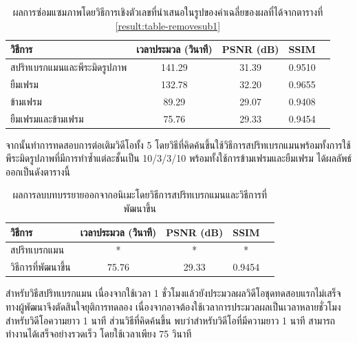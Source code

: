 	\begin{table}[H]
		\centering
		\begin{tabular}[ht]{|l|c|c|c|c|}
			\hline
			วิธีการ  & เวลาประมวล  (วินาที) & PSNR (dB) & SSIM \\
			\hline
			สปริทเบรกแมนและพีระมิดรูปภาพ & 141.29 & 31.39  &  0.9510\\
			ยืมเฟรม & 132.78 & 32.20 & 0.9655\\
			ข้ามเฟรม & 89.29 & 29.07 & 0.9408 \\
			ยืมเฟรมและข้ามเฟรม & 75.76 & 29.33 & 0.9454 \\
			\hline
		\end{tabular}
		\caption{ผลการซ่อมแซมภาพโดยวิธีการเชิงตัวเลขที่นำเสนอในรูปของค่าเฉลี่ยของผลที่ได้จากตารางที่ \ref{result:table-removesub1}}
	\end{table}	
	
	\hspace{1cm}  จากนั้นทำการทดสอบการต่อเติมวิดีโอทั้ง 5 โดยวิธีที่คิดค้นขึ้นใช้วิธีการสปริทเบรกแมนพร้อมทั้งการใช้พีระมิดรูปภาพที่มีการทำซ้ำแต่ละชั้นเป็น 10/3/3/10  พร้อมทั้งใช้การข้ามเฟรมและยืมเฟรม ได้ผลลัพธ์ออกเป็นดังตารางนี้
	 
\begin{table}[H]
	\centering
	\begin{tabular}[ht]{|l|c|c|c|c|}
		\hline
		วิธีการ  & เวลาประมวล  (วินาที) & PSNR (dB) & SSIM \\
		\hline
		สปริทเบรกแมน & * & * & * \\
		วิธีการที่พัฒนาขึ้น & 75.76 & 29.33 & 0.9454 \\
		\hline
	\end{tabular}
	\caption{ผลการลบบทบรรยายออกจากอนิเมะโดยวิธีการสปริทเบรกแมนและวิธีการที่พัฒนาขึ้น}
\end{table}	

\hspace{1cm} สำหรับวิธีสปริทเบรกแมน เนื่องจากใช้เวลา 1 ชั่วโมงแล้วยังประมวลผลวิดีโอชุดทดสอบแรกไม่เสร็จ ทางผู้พัฒนาจึงตัดสินใจยุติการทดลอง เนื่องจากอาจต้องใช้เวลาการประมวลผลเป็นเวลาหลายชั่วโมงสำหรับวิดีโอความยาว 1 นาที ส่วนวิธีที่คิดค้นขึ้น พบว่าสำหรับวิดีโอที่มีความยาว 1 นาที สามารถทำงานได้เสร็จอย่างรวดเร็ว โดยใช้เวลาเพียง 75 วินาที
\clearpage